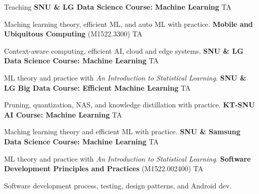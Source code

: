 \begin{rubric}{Teaching}
	\entry*[Jan 2026]%
	\textbf{SNU \& LG Data Science Course: Machine Learning} TA\par
	Maching learning theory, efficient ML, and auto ML with practice.
	\entry*[Fall 2025]%
	\textbf{Mobile and Ubiquitous Computing} (M1522.3300) TA\par
	Context-aware computing, efficient AI, cloud and edge systems.
	\entry*[Jan 2025]%
	\textbf{SNU \& LG Data Science Course: Machine Learning} TA\par
	ML theory and practice with \textit{An Introduction to Statistical Learning}.
	\entry*[Jul 2024]%
	\textbf{SNU \& LG Big Data Course: Efficient Machine Learning} TA\par
	Pruning, quantization, NAS, and knowledge distillation with practice.
	\entry*[Jun 2024]%
	\textbf{KT-SNU AI Course: Machine Learning} TA\par
	Maching learning theory and efficient ML with practice.
	\entry*[Apr 2024]%
	\textbf{SNU \& Samsung Data Science Course: Machine Learning} TA\par
	ML theory and practice with \textit{An Introduction to Statistical Learning}.
	\entry*[Fall 2023]%
	\textbf{Software Development Principles and Practices} (M1522.002400) TA\par
	Software development process, testing, design patterns, and Android dev.
\end{rubric}